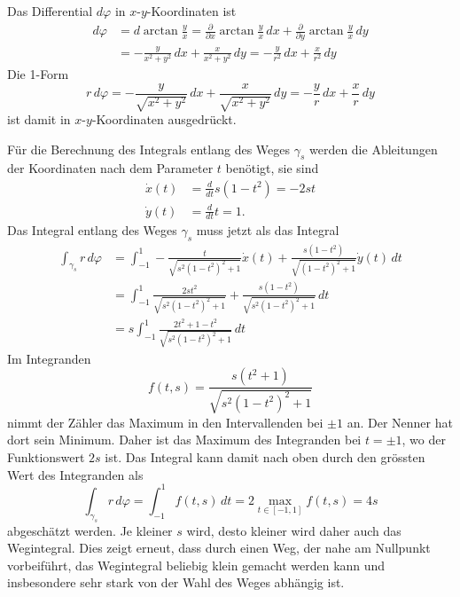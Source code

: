 \begin{beispiel}
Das Differential $d\varphi$ in $x$-$y$-Koordinaten ist
\begin{align*}
d\varphi
&=
d\arctan\frac{y}{x}
=
\frac{\partial}{\partial x}\arctan\frac{y}{x}\,dx
+
\frac{\partial}{\partial y}\arctan\frac{y}{x}\,dy
\\
&=
-\frac{y}{x^2+y^2}\,dx
+
\frac{x}{x^2+y^2}\,dy
=
-\frac{y}{r^2}\,dx
+
\frac{x}{r^2}\,dy
\end{align*}
Die 1-Form
\[
r\,d\varphi
=
-\frac{y}{\sqrt{x^2+y^2}}\,dx
+
\frac{x}{\sqrt{x^2+y^2}}\,dy
=
-\frac{y}{r}\,dx
+
\frac{x}{r}\,dy
\]
ist damit in $x$-$y$-Koordinaten ausgedrückt.

Für die Berechnung des Integrals entlang des Weges $\gamma_s$ werden
die Ableitungen der Koordinaten nach dem Parameter $t$ benötigt, sie
sind
\begin{align*}
\dot{x}(t) &= \frac{d}{dt} s(1-t^2) = -2st \\
\dot{y}(t) &= \frac{d}{dt} t = 1.
\end{align*}
Das Integral entlang des Weges $\gamma_s$ muss jetzt als das Integral
\begin{align*}
\int_{\gamma_s} r\,d\varphi
&=
\int_{-1}^1
-\frac{t}{\sqrt{s^2(1-t^2)^2+1}} \dot{x}(t)
+\frac{s(1-t^2)}{\sqrt{(1-t^2)^2+1}} \dot{y}(t)
\,dt
\\
&=
\int_{-1}^1
\frac{2st^2}{\sqrt{s^2(1-t^2)^2+1}} 
+\frac{s(1-t^2)}{\sqrt{s^2(1-t^2)^2+1}}
\,dt
\\
&=
s\int_{-1}^1
\frac{2t^2+1-t^2}{\sqrt{s^2(1-t^2)^2+1}}
\,dt
\end{align*}
Im Integranden
\[
f(t,s)
=
\frac{s(t^2+1)}{\sqrt{s^2(1-t^2)^2+1}}
\]
nimmt der Zähler das Maximum in den Intervallenden bei $\pm 1$ an.
Der Nenner hat dort sein Minimum.
Daher ist das Maximum des Integranden bei $t=\pm1$, wo der Funktionswert
$2s$ ist.
Das Integral kann damit nach oben durch den grössten
Wert des Integranden als
\[
\int_{\gamma_s} r\,d\varphi
=
\int_{-1}^1 f(t,s)\,dt
=
2 \max_{t\in[-1,1]} f(t,s)
=
4s
\]
abgeschätzt werden.
Je kleiner $s$ wird, desto kleiner wird daher auch das Wegintegral.
Dies zeigt erneut, dass durch einen Weg, der nahe am Nullpunkt vorbeiführt,
das Wegintegral beliebig klein gemacht werden kann und insbesondere
sehr stark von der Wahl des Weges abhängig ist.
\end{beispiel}

%
%
